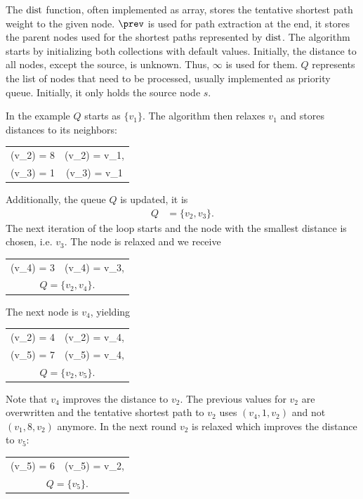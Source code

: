 	The $\operatorname{dist}$ function, often implemented as array, stores the tentative shortest path weight to the given node.
	$\prev$ is used for path extraction at the end, it stores the parent nodes used for the shortest paths represented by $\operatorname{dist}$.
	The algorithm starts by initializing both collections with default values. Initially, the distance to all nodes, except the source, is unknown.
	Thus, $\infty$ is used for them. $Q$ represents the list of nodes that need to be processed, usually implemented as priority queue.
	Initially, it only holds the source node $s$.
	
	In the example $Q$ starts as $\{v_1\}$. The algorithm then relaxes $v_1$ and stores distances to its neighbors:
	\begin{center}
		\begin{tabular}{CC}
			\dist(v_2) = 8	&\prev(v_2) = v_1,\\
			\dist(v_3) = 1	&\prev(v_3) = v_1
		\end{tabular}
	\end{center}
	Additionally, the queue $Q$ is updated, it is
	\begin{align*}
		Q	&= \{v_2, v_3\}.
	\end{align*}
	The next iteration of the loop starts and the node with the smallest distance is chosen, i.e. $v_3$. The node is relaxed and we receive
	\begin{center}
		\begin{tabular}{CC}
			\dist(v_4) = 3	&\prev(v_4) = v_3,\\
			\multicolumn{2}{c}{$Q = \{v_2, v_4\}.$}
		\end{tabular}
	\end{center}
	The next node is $v_4$, yielding
	\begin{center}
		\begin{tabular}{CC}
			\dist(v_2) = 4	&\prev(v_2) = v_4,\\
			\dist(v_5) = 7	&\prev(v_5) = v_4,\\
			\multicolumn{2}{c}{$Q = \{v_2, v_5\}.$}
		\end{tabular}
	\end{center}
	Note that $v_4$ improves the distance to $v_2$. The previous values for $v_2$ are overwritten and the
	tentative shortest path to $v_2$ uses $(v_4, 1, v_2)$ and not $(v_1, 8, v_2)$ anymore.
	In the next round $v_2$ is relaxed which improves the distance to $v_5$:
	\begin{center}
		\begin{tabular}{CC}
			\dist(v_5) = 6	&\prev(v_5) = v_2,\\
			\multicolumn{2}{c}{$Q = \{v_5\}.$}
		\end{tabular}
	\end{center}
